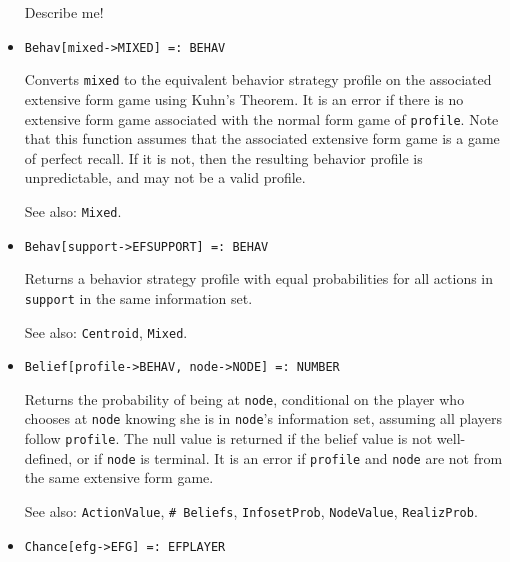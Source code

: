 \begin{itemize}
\bd
Describe me!
\ed

\item{}
\protect \large \begin{verbatim}
Behav[mixed->MIXED] =: BEHAV 
\end{verbatim}\normalsize

\bd 
Converts \verb+mixed+ to the equivalent behavior strategy profile on
the associated extensive form game using Kuhn's Theorem.  It is an
error if there is no extensive form game associated with the normal
form game of \verb+profile+.  Note that this function assumes that the
associated extensive form game is a game of perfect recall.  If it is
not, then the resulting behavior profile is unpredictable, and may not
be a valid profile.
\item [See also:] \verb+Mixed+.
\ed

\item{}
\protect \large \begin{verbatim}
Behav[support->EFSUPPORT] =: BEHAV 
\end{verbatim}\normalsize

\bd
Returns a behavior strategy profile with equal
probabilities for all actions in \verb+support+ in the same information set. 
\item [See also:] \verb+Centroid+, \verb+Mixed+.
\ed

\item{}
\protect \large \begin{verbatim}
Belief[profile->BEHAV, node->NODE] =: NUMBER 
\end{verbatim}\normalsize

\bd
Returns the probability of being at \verb+node+, conditional on the
player who chooses at \verb+node+ knowing she is in \verb+node+'s
information set, assuming all players follow \verb+profile+.  The null
value is returned if the belief value is not well-defined, or if
\verb+node+ is terminal.  It is an error if \verb+profile+ and \verb+node+
are not from the same extensive form game.
\item [See also:] \verb+ActionValue+, \verb+# Beliefs+, \verb+InfosetProb+,
\verb+NodeValue+, \verb+RealizProb+.
\ed





\item{}
\protect \large \begin{verbatim}
Chance[efg->EFG] =: EFPLAYER 
\end{verbatim}\normalsize


\end{itemize}

